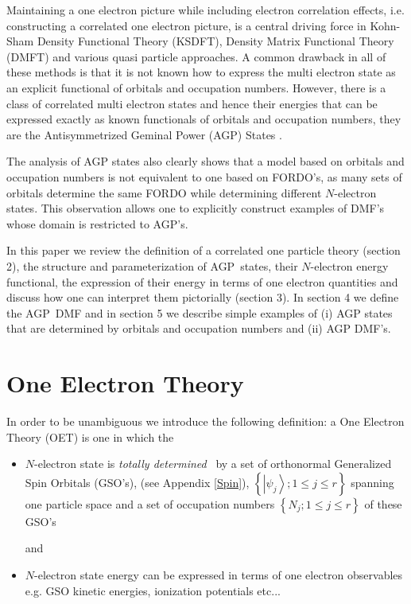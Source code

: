 \documentclass[aps,preprint]{revtex4}%
\begin{document}
Maintaining a one electron picture while including electron correlation
effects, i.e. constructing a correlated one electron picture, is a central
driving force in Kohn-Sham Density Functional Theory (KSDFT), Density Matrix
Functional Theory (DMFT) and various quasi particle approaches. A common
drawback in all of these methods is that it is not known how to express the
multi electron state as an explicit functional of orbitals and occupation
numbers. However, there is a class of correlated multi electron states and
hence their energies that can be expressed exactly as known functionals of
orbitals and occupation numbers, they are the Antisymmetrized Geminal Power
(AGP) States \cite{OrtizWeiner2006}.

The analysis of AGP states also clearly shows that a model based on orbitals
and occupation numbers is not equivalent to one based on FORDO's, as many sets
of orbitals determine the same FORDO while determining different $N$-electron
states. This observation allows one to explicitly construct examples of DMF's
whose domain is restricted to AGP's.

In this paper we review the definition of a correlated one particle theory
(section 2), the structure and parameterization of AGP\ states, their
$N$-electron energy functional, the expression of their energy in terms of one
electron quantities and discuss how one can interpret them pictorially
(section 3). In section 4 we define the AGP\ DMF and in section 5 we describe
simple examples of (i) AGP states that are determined by orbitals and
occupation numbers and (ii) AGP DMF's.

\section{One Electron Theory\label{OET}}

In order to be unambiguous we introduce the following definition: a One
Electron Theory (OET) is one in which the

\begin{itemize}
\item $N$-electron state is \emph{totally determined} \ by a set of
orthonormal Generalized Spin Orbitals (GSO's), (see Appendix \ref{Spin}),
$\left\{  \left\vert \psi_{j}\right\rangle ;1\leq j\leq r\right\}  $ spanning
one particle space and a set of occupation numbers $\left\{  N_{j};1\leq j\leq
r\right\}  $ of these GSO's

and

\item $N$-electron state energy can be expressed in terms of one electron
observables e.g. GSO kinetic energies, ionization potentials etc...
\end{itemize}
\end{document}
